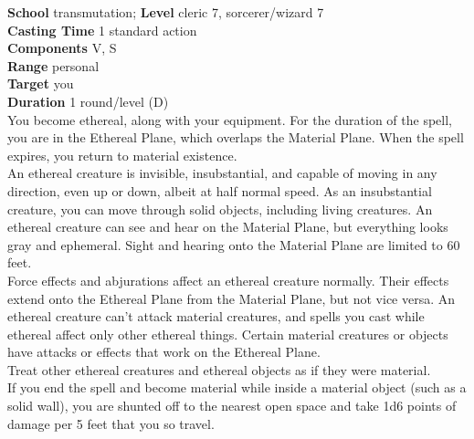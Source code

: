 \textbf{School} transmutation; \textbf{Level} cleric 7, sorcerer/wizard 7\\
\textbf{Casting Time} 1 standard action\\
\textbf{Components} V, S\\
\textbf{Range} personal\\
\textbf{Target} you\\
\textbf{Duration} 1 round/level (D)\\
You become ethereal, along with your equipment. For the duration of the spell, you are in the Ethereal Plane, which overlaps the Material Plane. When the spell expires, you return to material existence.\\
An ethereal creature is invisible, insubstantial, and capable of moving in any direction, even up or down, albeit at half normal speed. As an insubstantial creature, you can move through solid objects, including living creatures. An ethereal creature can see and hear on the Material Plane, but everything looks gray and ephemeral. Sight and hearing onto the Material Plane are limited to 60 feet.\\
Force effects and abjurations affect an ethereal creature normally. Their effects extend onto the Ethereal Plane from the Material Plane, but not vice versa. An ethereal creature can't attack material creatures, and spells you cast while ethereal affect only other ethereal things. Certain material creatures or objects have attacks or effects that work on the Ethereal Plane.\\
Treat other ethereal creatures and ethereal objects as if they were material. \\
If you end the spell and become material while inside a material object (such as a solid wall), you are shunted off to the nearest open space and take 1d6 points of damage per 5 feet that you so travel.\\
